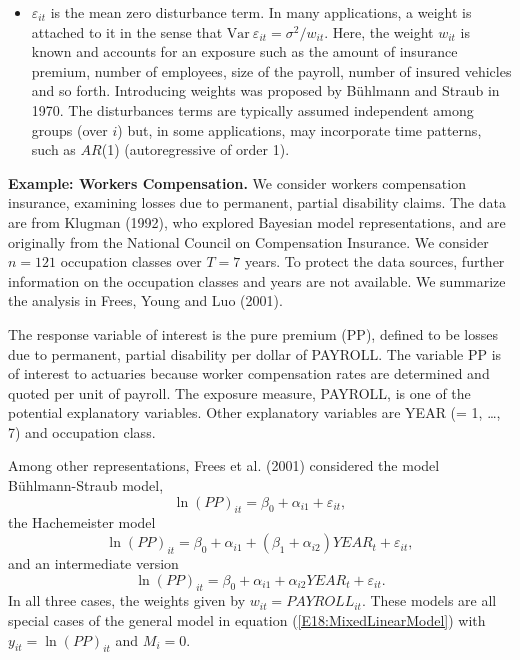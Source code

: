 \begin{itemize}
\item $\varepsilon_{it}$ is the mean zero disturbance term. In many
applications, a weight is attached to it in the sense that
$\mathrm{Var}~\varepsilon_{it} = \sigma^2 /w_{it}.$ Here, the weight
$w_{it}$ is known and accounts for an exposure such as the amount of
insurance premium, number of employees, size of the payroll, number
of insured vehicles and so forth. Introducing weights was proposed
by B\"{u}hlmann and Straub in 1970. The disturbances terms are
typically assumed independent among groups (over $i$) but, in some
applications, may incorporate time patterns, such as $AR$(1)
(autoregressive of order 1).

\end{itemize}



\linejed{}

\textbf{ Example: Workers Compensation.} We consider workers compensation insurance, examining
losses due to permanent, partial disability claims. The data are
from Klugman (1992), who explored Bayesian model representations,
and are originally from the National Council on Compensation
Insurance. We consider $n=121$ occupation classes over $T=7$ years.
To protect the data sources, further information on the occupation
classes and years are not available. We summarize the analysis in
Frees, Young and Luo (2001).

The response variable of interest is the pure premium (PP), defined
to be losses due to permanent, partial disability per dollar of
PAYROLL. The variable PP is of interest to actuaries because worker
compensation rates are determined and quoted per unit of payroll.
The exposure measure, PAYROLL, is one of the potential explanatory
variables. Other explanatory variables are YEAR (= 1, \ldots, 7) and
occupation class.

Among other representations, Frees et al. (2001) considered the
model B\"{u}hlmann-Straub model,
\begin{equation}\label{E18:WCBS}
\ln (PP)_{it} = \beta_0 + \alpha_{i1}+  \varepsilon_{it},
\end{equation}
the Hachemeister model
\begin{equation}\label{E18:WCHach}
\ln (PP)_{it} = \beta_0 + \alpha_{i1} + (\beta_1+\alpha_{i2})YEAR_t
+ \varepsilon_{it},
\end{equation}
and an intermediate version
\begin{equation}\label{E18:WCInt}
\ln (PP)_{it} = \beta_0 + \alpha_{i1}+  \alpha_{i2}YEAR_t +
\varepsilon_{it}.
\end{equation}
In all three cases, the weights given by $w_{it}= PAYROLL_{it}$.
These models are all special cases of the general model in equation
(\ref{E18:MixedLinearModel}) with $y_{it} = \ln (PP)_{it}$ and
$M_i=0$.

